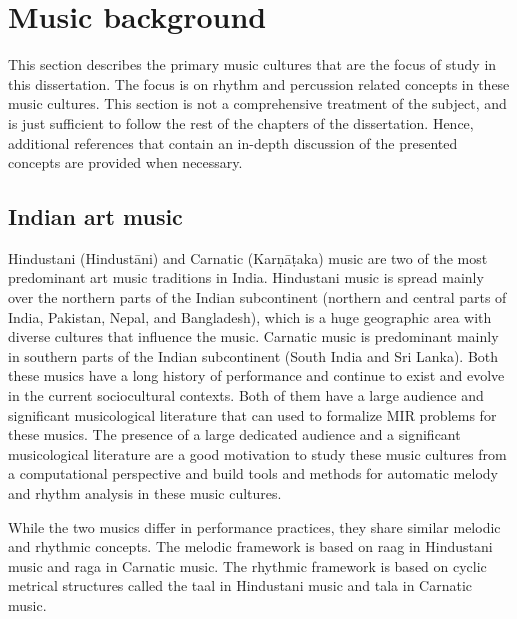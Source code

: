 \section{Music background}\label{sec:musicbkgnd}
This section describes the primary music cultures that are the focus of study in this dissertation. The focus is on rhythm and percussion related concepts in these music cultures. This section is not a comprehensive treatment of the subject, and is just sufficient to follow the rest of the chapters of the dissertation. Hence, additional references that contain an in-depth discussion of the presented concepts are provided when necessary. 
\subsection{Indian art music}
Hindustani (Hindustāni) and Carnatic (Karṇāṭaka) music are two of the most predominant art music traditions in India. Hindustani music is spread mainly over the northern parts of the Indian subcontinent (northern and central parts of India, Pakistan, Nepal, and Bangladesh), which is a huge geographic area with diverse cultures that influence the music. Carnatic music is predominant mainly in southern parts of the Indian subcontinent (South India and Sri Lanka). Both these musics have a long history of performance and continue to exist and evolve in the current sociocultural contexts. Both of them have a large audience and significant musicological literature that can used to formalize \gls{MIR} problems for these musics. The presence of a large dedicated audience and a significant musicological literature are a good motivation to study these music cultures from a computational perspective and build tools and methods for automatic melody and rhythm analysis in these music cultures. 

While the two musics differ in performance practices, they share similar melodic and rhythmic concepts. The melodic framework is based on \gls{raag} in Hindustani music and \gls{raga} in Carnatic music. The rhythmic framework is based on cyclic metrical structures called the \gls{taal} in Hindustani music and \gls{tala} in Carnatic music. 

